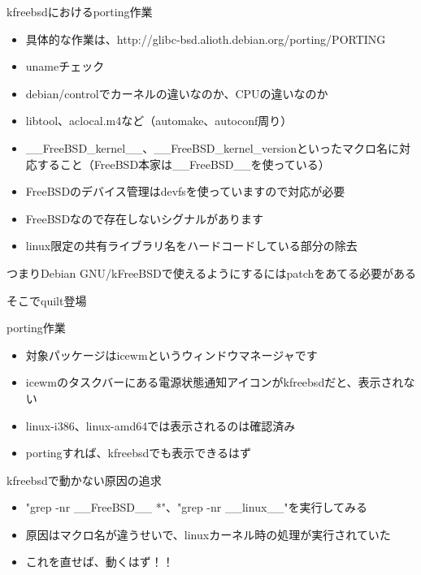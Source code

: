 \begin{frame}{kfreebsdにおけるporting作業}
 \begin{itemize}
  \item 具体的な作業は、http://glibc-bsd.alioth.debian.org/porting/PORTING
  \item unameチェック
  \item debian/controlでカーネルの違いなのか、CPUの違いなのか
  \item libtool、aclocal.m4など（automake、autoconf周り）
  \item \_\_FreeBSD\_kernel\_\_、\_\_FreeBSD\_kernel\_versionといったマクロ名に対応すること（FreeBSD本家は\_\_FreeBSD\_\_を使っている）
  \item FreeBSDのデバイス管理はdevfsを使っていますので対応が必要
  \item FreeBSDなので存在しないシグナルがあります
  \item linux限定の共有ライブラリ名をハードコードしている部分の除去
 \end{itemize}
\end{frame}

\begin{frame}
\begin{center}
\LARGE{つまりDebian GNU/kFreeBSDで使えるようにするにはpatchをあてる必要がある}
\end{center}
\end{frame}

\begin{frame}
\begin{center}
\LARGE{そこでquilt登場}
\end{center}
\end{frame}


\begin{frame}{porting作業}
 \begin{itemize}
  \item 対象パッケージはicewmというウィンドウマネージャです
  \item icewmのタスクバーにある電源状態通知アイコンがkfreebsdだと、表示されない
  \item linux-i386、linux-amd64では表示されるのは確認済み
  \item portingすれば、kfreebsdでも表示できるはず
 \end{itemize}
\end{frame}

\begin{frame}{kfreebsdで動かない原因の追求}
 \begin{itemize}
  \item "grep -nr \_\_FreeBSD\_\_ *"、"grep -nr \_\_linux\_\_"を実行してみる
  \item 原因はマクロ名が違うせいで、linuxカーネル時の処理が実行されていた
  \item これを直せば、動くはず！！
 \end{itemize}
\end{frame}

